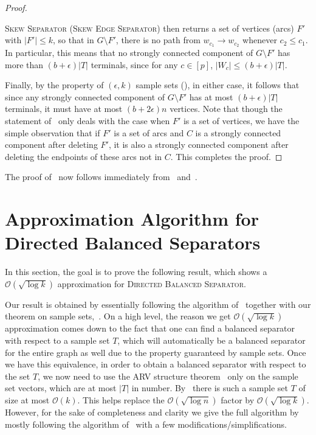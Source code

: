 \documentclass[11pt]{article}
\newcommand{\OO}{\mathcal{O}}
\newcommand{\DB}{{\textsc{Directed Balanced Separator}}}
\newcommand{\SMC}{{\textsc{Skew Separator}}}
\newcommand{\SMCE}{{\textsc{Skew Edge Separator}}}
\begin{document}
{\begin{proof}
\begin{itemize}
\SMC{} (\SMCE{}) then returns a set of vertices (arcs) $F'$ with $|F'| \leq k$, so that in $G \setminus F'$, there is no path from $w_{c_1} \rightarrow w_{c_2}$ whenever $c_2 \leq c_1$. In particular, this means that no strongly connected component of $G \setminus F'$ has more than $(b + \epsilon)|T|$ terminals, since for any $c \in [p]$, $|W_{c}| \leq (b + \epsilon)|T|$. 

\end{itemize}
Finally, by the property of $(\epsilon, k)$ sample sets (), in either case, it follows that since any strongly connected component of $G \setminus F'$ has at most $(b + \epsilon)|T|$ terminals, it must have at most $(b + 2\epsilon)n$ vertices. Note that though the statement of~ 
 only deals with the case when $F'$ is a set of vertices, we have the simple observation that if $F'$ is a set of arcs and $C$ is a strongly connected component after deleting $F'$, it is also a strongly connected component after deleting the endpoints of these arcs not in $C$. This completes the proof. 








\end{proof}




The proof of~ now follows immediately from~ and~.  







\section{Approximation Algorithm for Directed Balanced Separators}


In this section, the goal is to prove the following result, which shows a $\OO(\sqrt{\log k})$ approximation for \DB{}. 
\approxbalsep








Our result is obtained by essentially following the algorithm of~\cite{agarwal2005log} together with our theorem on sample sets,~. On a high level, the reason we get $\OO(\sqrt{\log k})$ approximation comes down to the fact that one can find a balanced separator with respect to a sample set $T$, which will automatically be a balanced separator for the entire graph as well due to the property guaranteed by sample sets. Once we have this equivalence, in order to obtain a balanced separator with respect to the set $T$, we now need to use the ARV structure theorem~\cite{arora2009expander} only on the sample set vectors, which are at most $|T|$ in number. By~ there is such a sample set $T$ of size at most $\OO(k)$. This helps replace the $\OO(\sqrt{\log n})$ factor by $\OO(\sqrt{\log k})$. However, for the sake of completeness and clarity we give the full algorithm by mostly following the algorithm of~\cite{agarwal2005log} with a few modifications/simplifications.

}
\end{document}
